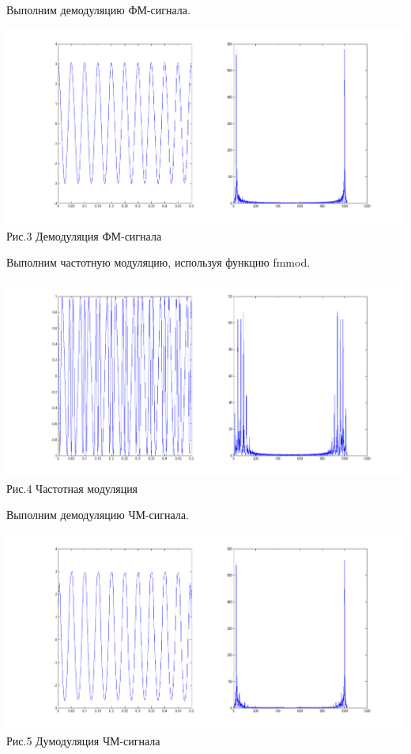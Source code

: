 \documentclass[a4paper]{article}
\begin{document}
Выполним демодуляцию ФМ-сигнала.

\begin{center}
	\includegraphics[scale = 0.45]{pm_demod.png} \\Рис.3 Демодуляция ФМ-сигнала
\end{center}

Выполним частотную модуляцию, используя функцию fmmod.

\begin{center}
	\includegraphics[scale = 0.45]{fm.png} \\Рис.4 Частотная модуляция
\end{center}

Выполним демодуляцию ЧМ-сигнала.

\begin{center}
	\includegraphics[scale = 0.45]{fm_demod.png} \\Рис.5 Думодуляция ЧМ-сигнала
\end{center}
\end{document}
